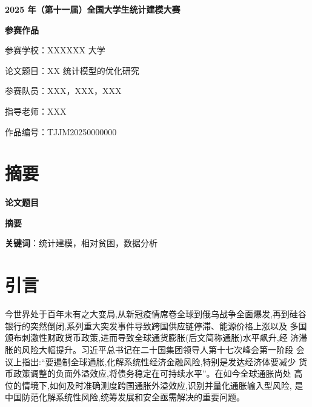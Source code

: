 \documentclass[12pt,a4paper]{article}
\begin{document}
\begin{titlepage}
    \centering
    { \bf 2025 年（第十一届）全国大学生统计建模大赛} \par
    \vspace{2cm}
    { \bf 参赛作品} \par
    \vspace{3cm}
    { 参赛学校：XXXXXX 大学} \par
    { 论文题目：XX 统计模型的优化研究} \par
    { 参赛队员：XXX，XXX，XXX} \par
    { 指导老师：XXX} \par
    \vfill
    { 作品编号：TJJM20250000000} \par
\end{titlepage}

\tableofcontents
\newpage

\section*{摘要}
\begin{spacing}{1.5} %
    { \bf 论文题目}  %
    \vspace{0.5cm}
    
    { \textbf{摘要}} \par  %
    
    \textbf{关键词}：统计建模，相对贫困，数据分析
\end{spacing}

\newpage

\section{引言}
今世界处于百年未有之大变局,从新冠疫情席卷全球到俄乌战争全面爆发,再到硅谷银行的突然倒闭,系列重大突发事件导致跨国供应链停滞、能源价格上涨以及  多国颁布刺激性财政货币政策,进而导致全球通货膨胀(后文简称通胀)水平飙升,经  济滞胀的风险大幅提升。习近平总书记在二十国集团领导人第十七次峰会第一阶段  会议上指出:“要遏制全球通胀,化解系统性经济金融风险,特别是发达经济体要减少  货币政策调整的负面外溢效应,将债务稳定在可持续水平”。在如今全球通胀尚处  高位的情境下,如何及时准确测度跨国通胀外溢效应,识别并量化通胀输入型风险,  是中国防范化解系统性风险,统筹发展和安全亟需解决的重要问题。
\end{document}
